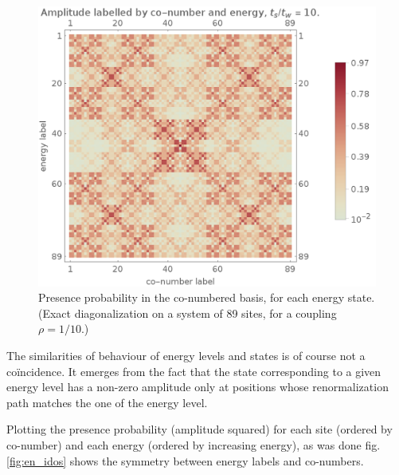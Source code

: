 \documentclass[11pt]{article}
\begin{document}
\begin{figure}[htp]
\centering
\includegraphics[scale=0.30]{wf_idos.png}
\caption{Presence probability in the co-numbered basis, for each energy state. (Exact diagonalization on a system of 89 sites, for a coupling $\rho = 1/10$.)}
\label{fig:wf_idos}
\end{figure}

The similarities of behaviour of energy levels and states is of course not a coïncidence. 
It emerges from the fact that the state corresponding to a given energy level has a non-zero amplitude only at positions whose renormalization path matches the one of the energy level.

Plotting the presence probability (amplitude squared) for each site (ordered by co-number) and each energy (ordered by increasing energy), as was done fig. \eqref{fig:en_idos} shows the symmetry between energy labels and co-numbers.

{}

\end{document}
